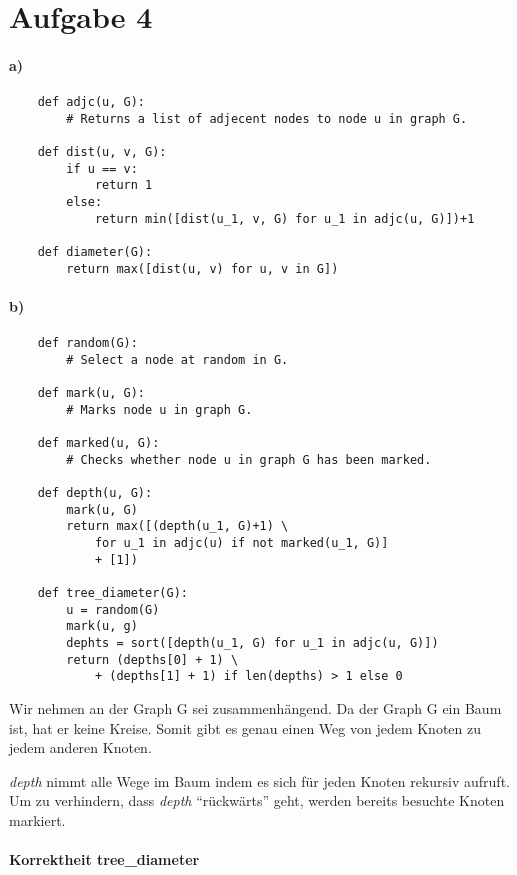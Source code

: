 \documentclass[a4paper,10pt]{scrartcl}
\begin{document}
\section*{Aufgabe 4}

\paragraph{a)}

\begin{verbatim}
    def adjc(u, G):
        # Returns a list of adjecent nodes to node u in graph G.

    def dist(u, v, G):
        if u == v:
            return 1
        else:
            return min([dist(u_1, v, G) for u_1 in adjc(u, G)])+1

    def diameter(G):
        return max([dist(u, v) for u, v in G])
\end{verbatim}

\paragraph{b)}

\begin{verbatim}
    def random(G):
        # Select a node at random in G.

    def mark(u, G):
        # Marks node u in graph G.

    def marked(u, G):
        # Checks whether node u in graph G has been marked.

    def depth(u, G):
        mark(u, G)
        return max([(depth(u_1, G)+1) \
            for u_1 in adjc(u) if not marked(u_1, G)]
            + [1])

    def tree_diameter(G):
        u = random(G)
        mark(u, g)
        dephts = sort([depth(u_1, G) for u_1 in adjc(u, G)])
        return (depths[0] + 1) \
            + (depths[1] + 1) if len(depths) > 1 else 0
\end{verbatim}

Wir nehmen an der Graph G sei zusammenhängend.
Da der Graph G ein Baum ist, hat er keine Kreise.
Somit gibt es genau einen Weg von jedem Knoten zu jedem anderen Knoten.

\emph{depth} nimmt alle Wege im Baum indem es sich für jeden Knoten rekursiv aufruft.
Um zu verhindern, dass \emph{depth} ``rückwärts'' geht, werden bereits besuchte Knoten markiert.

\paragraph{Korrektheit tree\_diameter}
\end{document}
